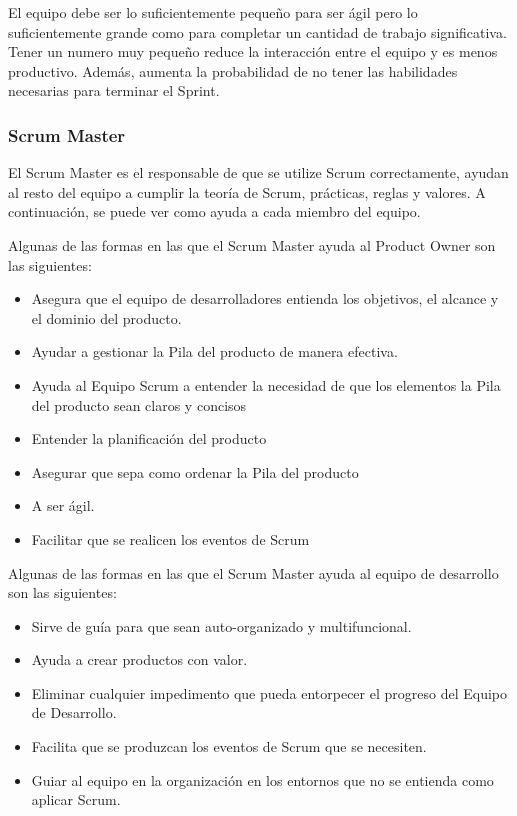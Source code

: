 El equipo debe ser lo suficientemente pequeño para ser ágil pero lo suficientemente grande como para completar 
un cantidad de trabajo significativa. Tener un numero muy pequeño reduce la interacción entre el equipo y es 
menos productivo. Además, aumenta la probabilidad de no tener las habilidades necesarias para terminar el 
Sprint.

\subsubsection{Scrum Master}

El Scrum Master es el responsable de que se utilize Scrum correctamente, ayudan al resto del equipo a cumplir 
la teoría de Scrum, prácticas, reglas y valores. A continuación, se puede ver como ayuda a cada miembro del 
equipo.

Algunas de las formas en las que el Scrum Master ayuda al Product Owner son las siguientes:
\begin{itemize}
	\item Asegura que el equipo de desarrolladores entienda los objetivos, el alcance y el dominio del producto.
	\item Ayudar a gestionar la Pila del producto de manera efectiva.
	\item Ayuda al Equipo Scrum a entender la necesidad de que los elementos la Pila del producto sean claros y 
	concisos
	\item Entender la planificación del producto
	\item Asegurar que sepa como ordenar la Pila del producto
	\item A ser ágil.
	\item Facilitar que se realicen los eventos de Scrum
 \end{itemize}

Algunas de las formas en las que el Scrum Master ayuda al equipo de desarrollo son las siguientes:
\begin{itemize}
	\item Sirve de guía para que sean auto-organizado y multifuncional.
	\item Ayuda a crear productos con valor.
	\item Eliminar cualquier impedimento que pueda entorpecer el progreso del Equipo de Desarrollo.
	\item Facilita que se produzcan los eventos de Scrum que se necesiten.
	\item Guiar al equipo en la organización en los entornos que no se entienda como aplicar Scrum.
\end{itemize}

